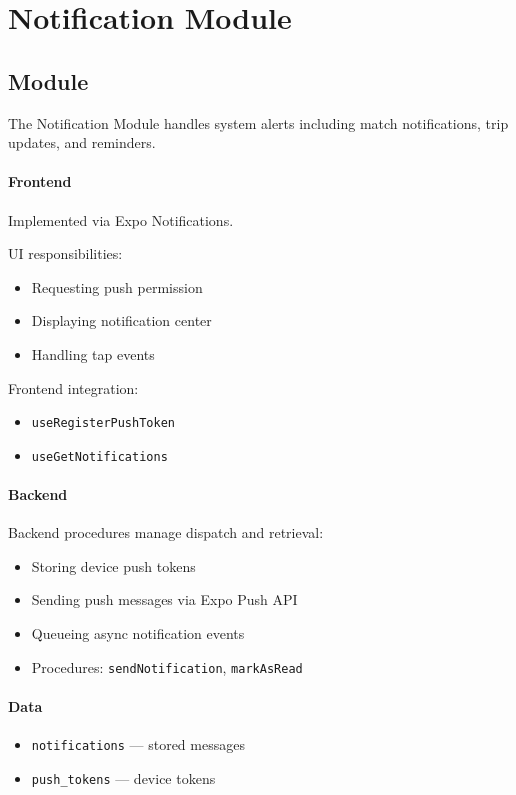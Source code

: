 \section{Notification Module}

\subsection{Module}
The Notification Module handles system alerts including match notifications, trip updates, and reminders.

\paragraph{Frontend}
Implemented via Expo Notifications.

UI responsibilities:
\begin{itemize}
    \item Requesting push permission
    \item Displaying notification center
    \item Handling tap events
\end{itemize}

Frontend integration:
\begin{itemize}
    \item \texttt{useRegisterPushToken}
    \item \texttt{useGetNotifications}
\end{itemize}

\paragraph{Backend}
Backend procedures manage dispatch and retrieval:
\begin{itemize}
    \item Storing device push tokens
    \item Sending push messages via Expo Push API
    \item Queueing async notification events
    \item Procedures: \texttt{sendNotification}, \texttt{markAsRead}
\end{itemize}

\paragraph{Data}
\begin{itemize}
    \item \texttt{notifications} --- stored messages
    \item \texttt{push\_tokens} --- device tokens
\end{itemize}

